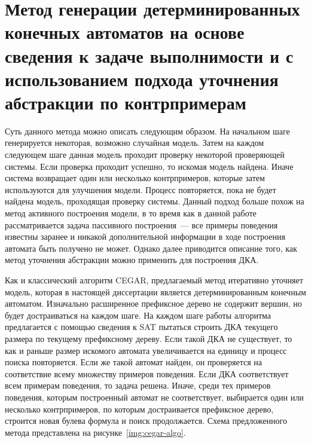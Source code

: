 \section{Метод генерации детерминированных конечных автоматов на основе сведения к задаче выполнимости и с использованием подхода уточнения абстракции по контрпримерам}
\label{sec:cegar:cegar-algo}

Суть данного метода можно описать следующим образом.
На начальном шаге генерируется некоторая, возможно случайная модель.
Затем на каждом следующем шаге данная модель проходит проверку некоторой проверяющей системы. Если проверка проходит успешно, то искомая модель найдена.
Иначе система возвращает один или несколько контрпримеров, которые затем используются для улучшения модели.
Процесс повторяется, пока не будет найдена модель, проходящая проверку системы.
Данный подход больше похож на метод активного построения модели, в то время как в данной работе рассматривается задача пассивного построения~--- все примеры поведения известны заранее и никакой дополнительной информации в ходе построения автомата быть получено не может.
Однако далее приводится описание того, как метод уточнения абстракции можно применить для построения ДКА.

Как и классический алгоритм CEGAR, предлагаемый метод итеративно уточняет модель, которая в настоящей диссертации является детерминированным конечным автоматом.
Изначально расширенное префиксное дерево не содержит вершин, но будет достраиваться на каждом шаге.
На каждом шаге работы алгоритма предлагается с помощью сведения к SAT пытаться строить ДКА текущего размера по текущему префиксному дереву.
Если такой ДКА не существует, то как и раньше размер искомого автомата увеличивается на единицу и процесс поиска повторяется.
Если же такой автомат найден, он проверяется на соответствие всему множеству примеров поведения.
Если ДКА соответствует всем примерам поведения, то задача решена.
Иначе, среди тех примеров поведения, которым построенный автомат не соответствует, выбирается один или несколько контрпримеров, по которым достраивается префиксное дерево, строится новая булева формула и поиск продолжается.
Схема предложенного метода представлена на рисунке~\ref{img:cegar-algo}.


